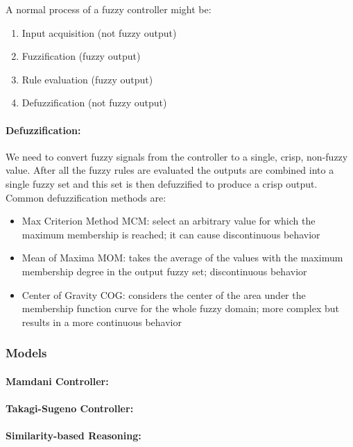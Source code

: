 A normal process of a fuzzy controller might be:
\begin{enumerate}
	\item Input acquisition (not fuzzy output)
	\item Fuzzification (fuzzy output)
	\item Rule evaluation (fuzzy output)
	\item Defuzzification (not fuzzy output)\\
\end{enumerate}

\paragraph{Defuzzification:} We need to convert fuzzy signals from the controller to a single, crisp, non-fuzzy value. After all the fuzzy rules are evaluated the outputs are combined into a single fuzzy set and this set is then defuzzified to produce a crisp output. Common defuzzification methods are: 
\begin{itemize}
	\item Max Criterion Method MCM: select an arbitrary value for which the maximum membership is reached; it can cause discontinuous behavior
	\item Mean of Maxima MOM: takes the average of the values with the maximum membership degree in the output fuzzy set; discontinuous behavior
	\item Center of Gravity COG: considers the center of the area under the membership function curve for the whole fuzzy domain; more complex but results in a more continuous behavior
\end{itemize}

\subsubsection{Models}

\paragraph{Mamdani Controller:}

\paragraph{Takagi-Sugeno Controller:}

\paragraph{Similarity-based Reasoning:}
